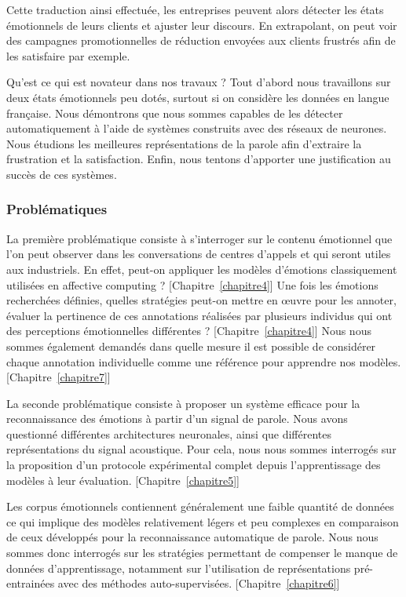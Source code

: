 Cette traduction ainsi effectuée, les entreprises peuvent alors détecter les états émotionnels de leurs clients et ajuster leur discours. En extrapolant, on peut voir des campagnes promotionnelles de réduction envoyées aux clients frustrés afin de les satisfaire par exemple.

Qu'est ce qui est novateur dans nos travaux ? Tout d'abord nous travaillons sur deux états émotionnels peu dotés, surtout si on considère les données en langue française. Nous démontrons que nous sommes capables de les détecter automatiquement à l'aide de systèmes construits avec des réseaux de neurones. Nous étudions les meilleures représentations de la parole afin d'extraire la frustration et la satisfaction. Enfin, nous tentons d'apporter une justification au succès de ces systèmes.

\subsubsection{Problématiques}
La première problématique consiste à s’interroger sur le contenu émotionnel que l’on peut observer dans les conversations de centres d’appels et qui seront utiles aux industriels. En effet, peut-on appliquer les modèles d’émotions classiquement utilisées en affective computing ? [Chapitre~\ref{chapitre4}] Une fois les émotions recherchées définies, quelles stratégies peut-on mettre en œuvre pour les annoter, évaluer la pertinence de ces annotations réalisées par plusieurs individus qui ont des perceptions émotionnelles différentes ? [Chapitre~\ref{chapitre4}] Nous nous sommes également demandés dans quelle mesure il est possible de considérer chaque annotation individuelle comme une référence pour apprendre nos modèles. [Chapitre~\ref{chapitre7}]

La seconde problématique consiste à proposer un système efficace pour la reconnaissance des émotions à partir d’un signal de parole. Nous avons questionné différentes architectures neuronales, ainsi que différentes représentations du signal acoustique. Pour cela, nous nous sommes interrogés sur la proposition d’un protocole expérimental complet depuis l’apprentissage des modèles à leur évaluation. [Chapitre~\ref{chapitre5}]

Les corpus émotionnels contiennent généralement une faible quantité de données ce qui implique des modèles relativement légers et peu complexes en comparaison de ceux développés pour la reconnaissance automatique de parole. Nous nous sommes donc interrogés sur les stratégies permettant de compenser le manque de données d’apprentissage, notamment sur l’utilisation de représentations pré-entrainées avec des méthodes auto-supervisées. [Chapitre~\ref{chapitre6}]

